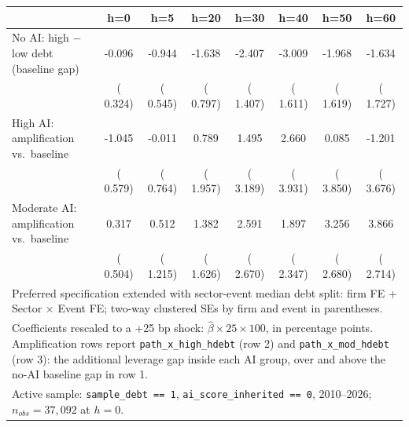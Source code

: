 \begin{tabular}{lccccccc}\hline\hline
 & h=0 & h=5 & h=20 & h=30 & h=40 & h=50 & h=60 \\
\hline
No AI: high $-$ low debt (baseline gap) & -0.096 & -0.944 & -1.638 & -2.407 & -3.009 & -1.968 & -1.634 \\
 & ( 0.324) & ( 0.545) & ( 0.797) & ( 1.407) & ( 1.611) & ( 1.619) & ( 1.727) \\
High AI: amplification vs.\ baseline & -1.045 & -0.011 &  0.789 &  1.495 &  2.660 &  0.085 & -1.201 \\
 & ( 0.579) & ( 0.764) & ( 1.957) & ( 3.189) & ( 3.931) & ( 3.850) & ( 3.676) \\
Moderate AI: amplification vs.\ baseline &  0.317 &  0.512 &  1.382 &  2.591 &  1.897 &  3.256 &  3.866 \\
 & ( 0.504) & ( 1.215) & ( 1.626) & ( 2.670) & ( 2.347) & ( 2.680) & ( 2.714) \\
\hline\hline
\multicolumn{8}{l}{\footnotesize Preferred specification extended with sector-event median debt split: firm FE + Sector $\times$ Event FE; two-way clustered SEs by firm and event in parentheses.} \\
\multicolumn{8}{l}{\footnotesize Coefficients rescaled to a +25 bp shock: $\hat\beta \times 25 \times 100$, in percentage points. Amplification rows report \texttt{path\_x\_high\_hdebt} (row 2) and \texttt{path\_x\_mod\_hdebt} (row 3): the additional leverage gap inside each AI group, over and above the no-AI baseline gap in row 1.} \\
\multicolumn{8}{l}{\footnotesize Active sample: \texttt{sample\_debt == 1}, \texttt{ai\_score\_inherited == 0}, 2010--2026; $n_{obs} = 37{,}092$ at $h = 0$.} \\
\end{tabular}
